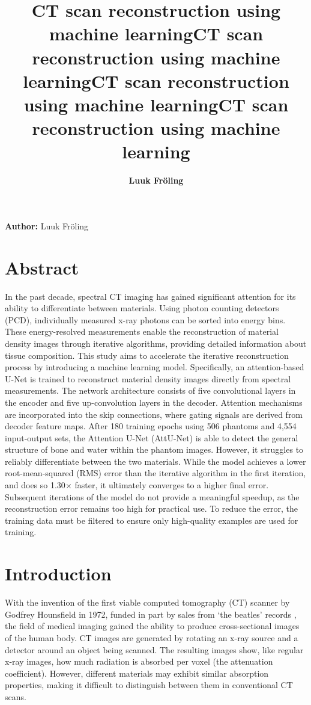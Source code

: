 \documentclass{article}
\title{CT scan reconstruction using machine learning}
\title{CT scan reconstruction using machine learning}
\title{CT scan reconstruction using machine learning}
\title{CT scan reconstruction using machine learning}
\date{\displaydate{articleDate}}
\author{\bfseries Luuk Fröling\mdseries\\}
\begin{document}
\maketitle

\textbf{Author:} Luuk Fröling

\section{Abstract}

In the past decade, spectral CT imaging has gained significant attention for its ability to differentiate between materials. Using photon counting detectors (PCD), individually measured x-ray photons can be sorted into energy bins. These energy-resolved measurements enable the reconstruction of material density images through iterative algorithms, providing detailed information about tissue composition. This study aims to accelerate the iterative reconstruction process by introducing a machine learning model. Specifically, an attention-based U-Net is trained to reconstruct material density images directly from spectral measurements. The network architecture consists of five convolutional layers in the encoder and five up-convolution layers in the decoder. Attention mechanisms are incorporated into the skip connections, where gating signals are derived from decoder feature maps. After 180 training epochs using 506 phantoms and 4,554 input-output sets, the Attention U-Net (AttU-Net) is able to detect the general structure of bone and water within the phantom images. However, it struggles to reliably differentiate between the two materials. While the model achieves a lower root-mean-squared (RMS) error than the iterative algorithm in the first iteration, and does so 1.30$\times$ faster, it ultimately converges to a higher final error. Subsequent iterations of the model do not provide a meaningful speedup, as the reconstruction error remains too high for practical use. To reduce the error, the training data must be filtered to ensure only high-quality examples are used for training.

\section{Introduction}

With the invention of the first viable computed tomography (CT) scanner by Godfrey Hounsfield  in 1972, funded in part by sales from `the beatles' records \citep{pietzsch2025ct}, the field of medical imaging gained the ability to produce cross-sectional images of the human body. CT images are generated by rotating an x-ray source and a detector around an object being scanned. The resulting images show, like regular x-ray images, how much radiation is absorbed per voxel (the attenuation coefficient). However, different materials may exhibit similar absorption properties, making it difficult to distinguish between them in conventional CT scans.
\end{document}
